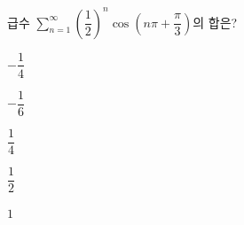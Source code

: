 급수 $\displaystyle\sum_{n=1}^{\infty} \left(\dfrac{1}{2}\right)^n \cos\left(n\pi+\dfrac{\pi}{3}\right)$의 합은?
\begin{choices32}{\rule[-3ex]{0pt}{8ex}$-\dfrac{1}{4}$}{\rule[-3ex]{0pt}{8ex}$-\dfrac{1}{6}$}{\rule[-3ex]{0pt}{8ex}$\dfrac{1}{4}$}{\rule[-3ex]{0pt}{8ex}$\dfrac{1}{2}$}{\rule[-3ex]{0pt}{8ex}$1$}\end{choices32}
